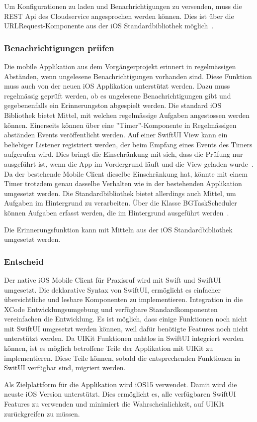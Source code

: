 Um Konfigurationen zu laden und Benachrichtigungen zu versenden, muss die REST Api des Cloudservice angesprochen werden können.
Dies ist über die URLRequest-Komponente aus der iOS Standardbibliothek möglich~\cite{ios_urlrequest}.

\subsubsection{Benachrichtigungen prüfen}

Die mobile Applikation aus dem Vorgängerprojekt erinnert in regelmässigen Abständen, wenn ungelesene Benachrichtigungen vorhanden sind.
Diese Funktion muss auch von der neuen iOS Applikation unterstützt werden.
Dazu muss regelmässig geprüft werden, ob es ungelesene Benachrichtigungen gibt und gegebenenfalls ein Erinnerungston abgespielt werden.
Die standard iOS Bibliothek bietet Mittel, mit welchen regelmässige Aufgaben angestossen werden können.
Einerseits können über eine ''Timer''-Komponente in Regelmässigen abständen Events veröffentlicht werden.
Auf einer SwiftUI View kann ein beliebiger Listener registriert werden, der beim Empfang eines Events des Timers aufgerufen wird.
Dies bringt die Einschränkung mit sich, dass die Prüfung nur ausgeführt ist, wenn die App im Vordergrund läuft und die View geladen wurde~\cite{ios_timer}.
Da der bestehende Mobile Client dieselbe Einschränkung hat, könnte mit einem Timer trotzdem genau dasselbe Verhalten wie in der bestehenden Applikation umgesetzt werden.
Die Standardbibliothek bietet allerdings auch Mittel, um Aufgaben im Hintergrund zu verarbeiten.
Über die Klasse BGTaskScheduler können Aufgaben erfasst werden, die im Hintergrund ausgeführt werden~\cite{ios_bgtaskscheduler}.

Die Erinnerungsfunktion kann mit Mitteln aus der iOS Standardbibliothek umgesetzt werden.

\subsubsection{Entscheid}

Der native iOS Mobile Client für Praxisruf wird mit Swift und SwiftUI umgesetzt.
Die deklarative Syntax von SwiftUI, ermöglicht es einfacher übersichtliche und lesbare Komponenten zu implementieren.
Integration in die XCode Entwicklungsumgebung und verfügbare Standardkomponenten vereinfachen die Entwicklung.
Es ist möglich, dass einige Funktionen noch nicht mit SwiftUI umgesetzt werden können, weil dafür benötigte Features noch nicht unterstützt werden.
Da UIKit Funktionen nahtlos in SwiftUI integriert werden können, ist es möglich betroffene Teile der Applikation mit UIKit zu implementieren.
Diese Teile können, sobald die entsprechenden Funktionen in SwitUI verfügbar sind, migriert werden.

Als Zielplattform für die Applikation wird iOS15 verwendet.
Damit wird die neuste iOS Version unterstützt.
Dies ermöglicht es, alle verfügbaren SwiftUI Features zu verwenden und minimiert die Wahrscheinlichkeit, auf UIKIt zurückgreifen zu müssen.

\clearpage

